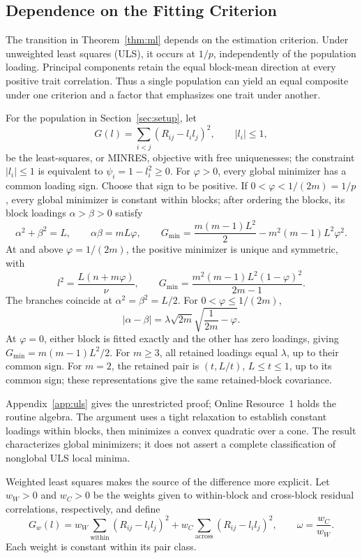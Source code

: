 \subsection{Dependence on the Fitting Criterion}
\label{sec:estimators}

The transition in Theorem~\ref{thm:ml} depends on the estimation criterion. Under unweighted least squares (ULS), it occurs at $1/p$, independently of the population loading. Principal components retain the equal block-mean direction at every positive trait correlation. Thus a single population can yield an equal composite under one criterion and a factor that emphasizes one trait under another.

\begin{theorem}
\label{thm:uls}
For the population in Section~\ref{sec:setup}, let
\[
G(l)=\sum_{i<j}(R_{ij}-l_il_j)^2,\qquad |l_i|\le1,
\]
be the least-squares, or MINRES, objective with free uniquenesses; the constraint $|l_i|\le1$ is equivalent to $\psi_i=1-l_i^2\ge0$. For $\varphi>0$, every global minimizer has a common loading sign. Choose that sign to be positive. If $0<\varphi<1/(2m)=1/p$, every global minimizer is constant within blocks; after ordering the blocks, its block loadings $\alpha>\beta>0$ satisfy
\[
\alpha^2+\beta^2=L,\qquad \alpha\beta=mL\varphi,
\qquad
G_{\min}=\frac{m(m-1)L^2}{2}-m^2(m-1)L^2\varphi^2.
\]
At and above $\varphi=1/(2m)$, the positive minimizer is unique and symmetric, with
\[
l^2=\frac{L(n+m\varphi)}{\nu },\qquad
G_{\min}=\frac{m^2(m-1)L^2(1-\varphi)^2}{2m-1}.
\]
The branches coincide at $\alpha^2=\beta^2=L/2$. For $0<\varphi\le1/(2m)$,
\[
|\alpha-\beta|=\lambda\sqrt{2m}\sqrt{\frac1{2m}-\varphi}.
\]
At $\varphi=0$, either block is fitted exactly and the other has zero loadings, giving $G_{\min}=m(m-1)L^2/2$. For $m\ge3$, all retained loadings equal $\lambda$, up to their common sign. For $m=2$, the retained pair is $(t,L/t)$, $L\le t\le1$, up to its common sign; these representations give the same retained-block covariance.

\end{theorem}

Appendix~\ref{app:uls} gives the unrestricted proof; Online Resource~1 holds the routine algebra. The argument uses a tight relaxation to establish constant loadings within blocks, then minimizes a convex quadratic over a cone. The result characterizes global minimizers; it does not assert a complete classification of nonglobal ULS local minima.

Weighted least squares makes the source of the difference more explicit. Let $w_W>0$ and $w_C>0$ be the weights given to within-block and cross-block residual correlations, respectively, and define
\[
G_w(l)=w_W\sum_{\mathrm{within}}(R_{ij}-l_il_j)^2
+w_C\sum_{\mathrm{across}}(R_{ij}-l_il_j)^2,
\qquad \omega=\frac{w_C}{w_W}.
\]
Each weight is constant within its pair class.

